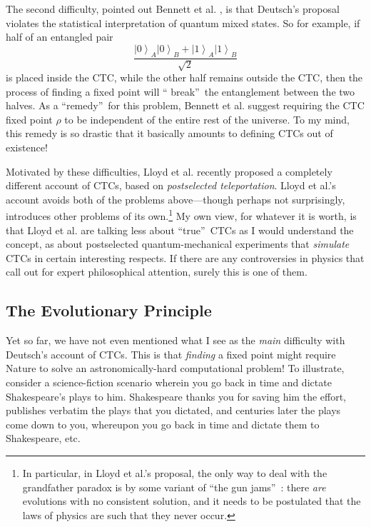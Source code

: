 \documentclass[12pt,onecolumn]{article}%
\begin{document}
The second difficulty, pointed out Bennett et al. \cite{blss}, is that
Deutsch's proposal violates the statistical interpretation of quantum mixed
states. So for example, if half of an entangled pair%
\[
\frac{\left\vert 0\right\rangle _{A}\left\vert 0\right\rangle _{B}+\left\vert
1\right\rangle _{A}\left\vert 1\right\rangle _{B}}{\sqrt{2}}%
\]
is placed inside the CTC, while the other half remains outside the CTC, then
the process of finding a fixed point will \textquotedblleft
break\textquotedblright\  the entanglement between the two halves. As a
\textquotedblleft remedy\textquotedblright\  for this problem, Bennett et
al. suggest requiring the CTC fixed point $\rho$ to be independent of the
entire rest of the universe. To my mind, this remedy is so drastic that it
basically amounts to defining CTCs out of existence!

Motivated by these difficulties, Lloyd et al. \cite{lmggs} recently proposed
a completely different account of CTCs, based on \textit{postselected
teleportation}. Lloyd et al.'s account avoids both of the problems
above---though perhaps not surprisingly, introduces other problems of its
own.\footnote{In particular, in Lloyd et al.'s proposal, the only way to deal
with the grandfather paradox is by some variant of \textquotedblleft the gun
jams\textquotedblright\ : there \textit{are} evolutions with no consistent
solution, and it needs to be postulated that the laws of physics are such that
they never occur.} My own view, for whatever it is worth, is that Lloyd et
al. are talking less about \textquotedblleft true\textquotedblright\  CTCs as
I would understand the concept, as about postselected quantum-mechanical
experiments that \textit{simulate} CTCs in certain interesting respects. If
there are any controversies in physics that call out for expert philosophical
attention, surely this is one of them.

\subsection{The Evolutionary Principle\label{EP}}

Yet so far, we have not even mentioned what I see as the \textit{main}
difficulty with Deutsch's account of CTCs. This is that \textit{finding} a
fixed point might require Nature to solve an astronomically-hard computational
problem! To illustrate, consider a science-fiction scenario wherein you go
back in time and dictate Shakespeare's plays to him. Shakespeare thanks you
for saving him the effort, publishes verbatim the plays that you dictated, and
centuries later the plays come down to you, whereupon you go back in time and
dictate them to Shakespeare, etc.
\end{document}
